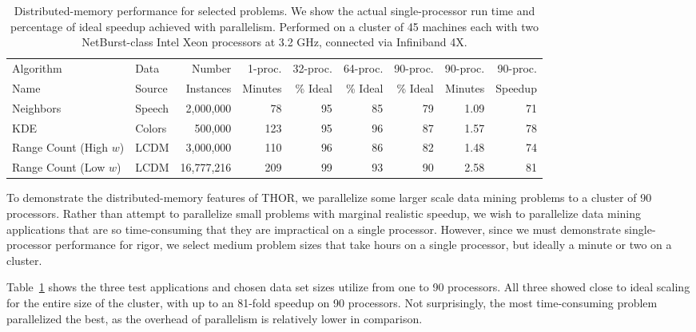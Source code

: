 \documentclass[twoside,leqno,twocolumn]{article}
\newcommand{\tab}[1]{Table~\ref{tab:#1}}
\begin{document}
\begin{table}
  \centering
  \begin{tabular}{|l|l|r|r||r|r|r||r|r|}
    \hline
    Algorithm               & Data      & Number     & 1-proc. & 32-proc.  & 64-proc.  & 90-proc.  & 90-proc. & 90-proc.
    \\
    Name                    & Source    & Instances  & Minutes & \% Ideal & \% Ideal & \% Ideal & Minutes & Speedup
    \\ \hline \hline
    Neighbors               & Speech    & 2,000,000  & 78  & 95 & 85 & 79 & 1.09 & 71
    \\ \hline
    KDE                     & Colors    & 500,000    & 123 & 95 & 96 & 87 & 1.57 & 78
    \\ \hline
    Range Count (High $w$)  & LCDM      & 3,000,000  & 110 & 96 & 86 & 82 & 1.48 & 74
    \\ \hline
    Range Count (Low $w$)   & LCDM      & 16,777,216 & 209 & 99 & 93 & 90 & 2.58 & 81
    \\ \hline
  \end{tabular}
  \caption{
  \label{tab:distributed}
  Distributed-memory performance for selected problems.
  We show the actual single-processor run time and percentage of ideal speedup achieved with parallelism.
  Performed on a cluster of 45 machines each with two NetBurst-class Intel Xeon processors at 3.2 GHz, connected via Infiniband 4X.
  }
\end{table}

To demonstrate the distributed-memory features of THOR, we parallelize some larger scale data mining problems to a cluster of 90 processors.
Rather than attempt to parallelize small problems with marginal realistic speedup, we wish to parallelize data mining applications that are so time-consuming that they are impractical on a single processor.
However, since we must demonstrate single-processor performance for rigor, we select medium problem sizes that take hours on a single processor, but ideally a minute or two on a cluster.

\tab{distributed} shows the three test applications and chosen data set sizes utilize from one to 90 processors.
All three showed close to ideal scaling for the entire size of the cluster, with up to an 81-fold speedup on 90 processors.
Not surprisingly, the most time-consuming problem parallelized the best, as the overhead of parallelism is relatively lower in comparison.
\end{document}
